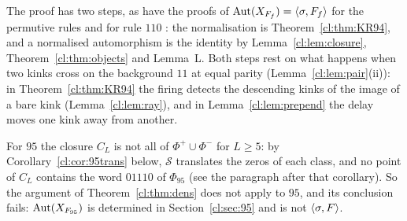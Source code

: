 The proof has two steps, as have the proofs of $\operatorname{Aut}(X_{F_f})=\langle\sigma,F_f\rangle$ for the permutive rules and for rule $110$ \cite{PaperB,PaperA}: the normalisation is Theorem~\ref{cl:thm:KR94}, and a normalised automorphism is the identity by Lemma~\ref{cl:lem:closure}, Theorem~\ref{cl:thm:objects} and Lemma~L. Both steps rest on what happens when two kinks cross on the background $11$ at equal parity (Lemma~\ref{cl:lem:pair}(ii)): in Theorem~\ref{cl:thm:KR94} the firing detects the descending kinks of the image of a bare kink (Lemma~\ref{cl:lem:ray}), and in Lemma~\ref{cl:lem:prepend} the delay moves one kink away from another.

\begin{remark}\label{cl:rem:dens}
For $95$ the closure $C_L$ is not all of $\Phi^+\cup\Phi^-$ for $L\ge5$: by Corollary~\ref{cl:cor:95trans} below, $\mathcal S$ translates the zeros of each class, and no point of $C_L$ contains the word $01110$ of $\Phi_{95}$ (see the paragraph after that corollary). So the argument of Theorem~\ref{cl:thm:dens} does not apply to $95$, and its conclusion fails: $\operatorname{Aut}(X_{F_{95}})$ is determined in Section~\ref{cl:sec:95} and is not $\langle\sigma,F\rangle$.
\end{remark}
